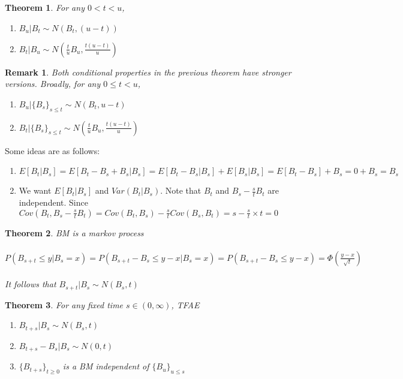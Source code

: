 \documentclass[12pt]{article}
\newtheorem{theorem}{Theorem}
\newtheorem*{remark}{Remark}
\begin{document}
\begin{theorem}
    For any $0 < t < u$,
    \begin{enumerate}
        \item $B_u | B_t \sim N(B_t,(u-t))$
        \item $B_t | B_u \sim N(\frac{t}{u}B_u, \frac{t(u-t)}{u})$
    \end{enumerate}
\end{theorem}

\begin{remark}
    Both conditional properties in the previous theorem have stronger versions. Broadly, for any $0 \leq t < u$,
    \begin{enumerate}
        \item $B_u| \{B_s\}_{s\leq t} \sim N(B_t, u-t )$
        \item $B_t | \{B_s\}_{s\leq t} \sim N(\frac{t}{u}B_u, \frac{t(u-t)}{u})$
    \end{enumerate}
\end{remark}

\noindent Some ideas are as follows:

\begin{enumerate}
    \item $E[B_t|B_s] = E[B_t-B_s+B_s|B_s] = E[B_t-B_s|B_s] + E[B_s|B_s] = E[B_t-B_s] + B_s = 0 + B_s = B_s$
    \item We want $E[B_t|B_s]$ and $Var(B_t|B_s)$. Note that $B_t$ and $B_s - \frac{s}{t}B_t$ are independent. Since $Cov(B_t, B_s - \frac{s}{t}B_t) = Cov(B_t, B_s) - \frac{s}{t}Cov(B_s,B_t) = s - \frac{s}{t}\times t = 0$
\end{enumerate}

\begin{theorem}
    BM is a markov process
    \\
    \\
    \begin{math}
    P(B_{s+t}\leq y | B_s = x) = P(B_{s+t} - B_s \leq y - x | B_s = x)
    =P(B_{s+t} - B_s \leq y - x)
    =\Phi (\frac{y-x}{\sqrt{t}})
    \end{math}
    \\
    \\It follows that $B_{s+t}|B_s \sim N(B_s,t)$
\end{theorem}

\begin{theorem}
    For any fixed time $s \in (0, \infty)$, TFAE
    \begin{enumerate}
        \item $B_{t+s} | B_s \sim N(B_s, t)$
        \item $B_{t+s} - B_s | B_s \sim N(0,t)$
        \item $\{B_{t+s}\}_{t\geq 0}$ is a BM independent of $\{B_u\}_{u \leq s}$
    \end{enumerate}
\end{theorem}
\end{document}
